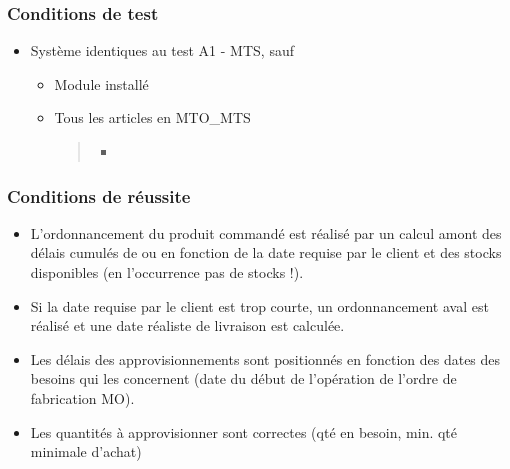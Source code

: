 \documentclass[letterpaper,10pt,french]{sphinxmanual}
\begin{document}
\subsubsection{Conditions de test}
\label{\detokenize{readthedocs/tests/A1_MTO_MTS:conditions-de-test}}\begin{itemize}
\item {} 
Système identiques au test A1 - MTS, sauf
\begin{itemize}
\item {} 
Module  installé

\item {} 
Tous les articles en MTO\_MTS
\begin{quote}

\begin{figure}[htbp]
\centering

\noindent{}
\end{figure}
\begin{itemize}
\item {} 

\end{itemize}
\end{quote}

\end{itemize}

\end{itemize}


\subsubsection{Conditions de réussite}
\label{\detokenize{readthedocs/tests/A1_MTO_MTS:conditions-de-reussite}}\begin{itemize}
\item {} 
L’ordonnancement du produit commandé est réalisé par un calcul amont des délais cumulés de  ou  en fonction de la date requise par le client et des stocks disponibles (en l’occurrence pas de stocks !).

\item {} 
Si la date requise par le client est trop courte, un ordonnancement aval est réalisé et une date réaliste de livraison est calculée.

\item {} 
Les délais des approvisionnements sont positionnés en fonction des dates des besoins qui les concernent (date du début de l’opération de l’ordre de fabrication MO).

\item {} 
Les quantités à approvisionner sont correctes (qté en besoin, min. qté minimale d’achat)

\end{itemize}
\end{document}
